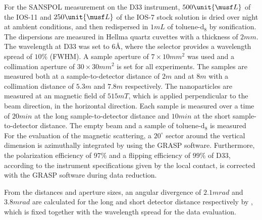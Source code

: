 \documentclass[\main/dresen_thesis.tex]{subfiles}
\begin{document}
    For the SANSPOL measurement on the D33 instrument, $500 \unit{\musf L}$ of the IOS-11 and $250 \unit{\musf L}$ of the IOS-7 stock solution is dried over night at ambient conditions, and then redispersed in $1 \unit{mL}$ of toluene-$\mathrm{d_8}$ by sonification.
    The dispersions are measured in Hellma quartz cuvettes with a thickness of $2 \unit{mm}$.
    The wavelength at D33 was set to $6 \unit{\angstrom}$, where the selector provides a wavelength spread of $10 \%$ (FWHM).
    A sample aperture  of $7 \times 10 \unit{mm^2}$ was used and a collimation aperture of $30 \times 30 \unit{mm^2}$ is set for all experiments.
    The samples are measured both at a sample-to-detector distance of $2 \unit{m}$ and at $8 \unit{m}$ with a collimation distance of $5.3 \unit{m}$ and $7.8 \unit{m}$ respectively.
    The nanoparticles are measured at an magnetic field of $515 \unit{mT}$, which is applied perpendicular to the beam direction, in the horizontal direction.
    Each sample is measured over a time of $20 \unit{min}$ at the long sample-to-detector distance and $10 \unit{min}$ at the short sample-to-detector distance.
    The empty beam and a sample of toluene-$\mathrm{d_8}$ is measured 
    For the evaluation of the magnetic scattering, a $20^\circ$ sector around the vertical dimension is azimuthally integrated by using the GRASP software.
    Furthermore, the polarization efficiency of $97 \%$ and a flipping efficiency of $99 \%$ of D33, according to the instrument specifications given by the local contact, is corrected with the GRASP software during data reduction.

    From the distances and aperture sizes, an angular divergence of $2.1 \unit{mrad}$ and $3.8 \unit{mrad}$ are calculated for the long and short detector distance respectively by , which is fixed together with the wavelength spread for the data evaluation.
\end{document}
